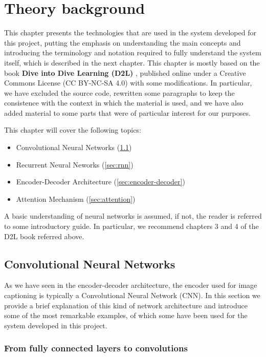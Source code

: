 \chapter{Theory background}
\label{ch:theory}

This chapter presents the technologies that are used in the system developed for this project, putting the emphasis on understanding the main concepts and introducing the terminology and notation required to fully understand the system itself, which is described in the next chapter. This chapter is mostly based on the book \textbf{Dive into Dive Learning (D2L)} \citep{Zhang2019d2l}, published online under a Creative Commons License (CC BY-NC-SA 4.0) with some modifications. In particular, we have excluded the source code, rewritten some paragraphs to keep the consistence with the context in which the material is used, and we have also added material to some parts that were of particular interest for our purposes.

This chapter will cover the following topics:

\begin{itemize}
    \item Convolutional Neural Networks (\cref{sec:cnn})
    \item Recurrent Neural Neworks (\cref{sec:rnn})
    \item Encoder-Decoder Architecture (\cref{sec:encoder-decoder})
    \item Attention Mechanism (\cref{sec:attention})
\end{itemize}

A basic understanding of neural networks is assumed, if not, the reader is referred to some introductory guide. In particular, we recommend chapters 3 and 4 of the D2L book referred above.

\section{Convolutional Neural Networks}\label{sec:cnn}

As we have seen in the encoder-decoder architecture, the encoder used for image captioning is typically a Convolutional Neural Network (CNN). In this section we provide a brief explanation of this kind of network architecture and introduce some of the most remarkable examples, of which some have been used for the system developed in this project.

\subsection{From fully connected layers to convolutions}

